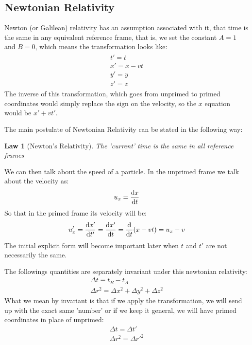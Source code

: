 \documentclass[12pt]{article}
\newtheorem{law}{Law}
\begin{document}
\subsection{Newtonian Relativity}
Newton (or Galilean) relativity has an assumption associated with it, that time is the same in any equivalent reference frame, that is, we set the constant $A=1$ and $B=0$, which means the transformation looks like:
\begin{align*}
  \boxed{
    \begin{matrix}
      t'=t\\
      x'=x-vt\\
      y'=y\\
      z'=z
    \end{matrix}
  }
\end{align*}
The inverse of this transformation, which goes from unprimed to primed coordinates would simply replace the sign on the velocity, so the $x$ equation would be $x'+vt'$.

The main postulate of Newtonian Relativity can be stated in the following way:
\begin{law}[Newton's Relativity]
  The 'current' time is the same in all reference frames
\end{law}

We can then talk about the speed of a particle. In the unprimed frame we talk about the velocity as:
\begin{align*}
  u_x=\dv{x}{t}
\end{align*}
So that in the primed frame its velocity will be:
\begin{align*}
  u_x'=\dv{x'}{t'}=\dv{x'}{t}=\dv{t}\qty(x-vt)=u_x-v
\end{align*}
The initial explicit form will become important later when $t$ and $t'$ are not necessarily the same.

The followings quantities are separately invariant under this newtonian relativity:
\begin{gather*}
  \Delta{t}\equiv t_B-t_A\\
  \Delta{r}^2=\Delta{x}^2+\Delta{y}^2+\Delta{z}^2
\end{gather*}
What we mean by invariant is that if we apply the transformation, we will send up with the exact same 'number' or if we keep it general, we will have primed coordinates in place of unprimed:
\begin{gather*}
  \Delta{t}=\Delta{t}'\\
  \Delta{r}^2=\Delta{r'}^2
\end{gather*}
\end{document}
